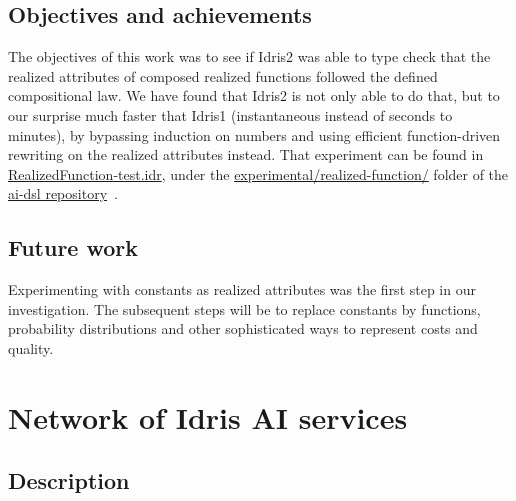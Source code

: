 \documentclass[]{report}
\begin{document}
\subsection{Objectives and achievements}

The objectives of this work was to see if Idris2 was able to type
check that the realized attributes of composed realized functions
followed the defined compositional law.  We have found that Idris2 is
not only able to do that, but to our surprise much faster that Idris1
(instantaneous instead of seconds to minutes), by bypassing induction
on numbers and using efficient function-driven rewriting on the
realized attributes instead.  That experiment can be found in
\href{https://github.com/singnet/ai-dsl/blob/master/experimental/realized-function/RealizedFunction-test.idr}{RealizedFunction-test.idr},
under the
\href{https://github.com/singnet/ai-dsl/blob/master/experimental/realized-function/}{experimental/realized-function/}
folder of the \href{https://github.com/singnet/ai-dsl/}{ai-dsl
  repository}~\cite{AIDSLRepo}.

\subsection{Future work}

Experimenting with constants as realized attributes was the first step
in our investigation.  The subsequent steps will be to replace
constants by functions, probability distributions and other
sophisticated ways to represent costs and quality.

\section{Network of Idris AI services}
\label{network_idris_ai_services}

\subsection{Description}
\end{document}
